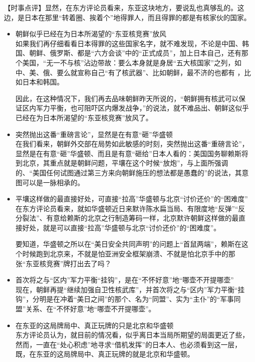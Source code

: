 \documentclass[a4paper,11pt]{article}
\begin{document}
\begin{itemize}
   【时事点评】显然，在东方评论员看来，东亚这块地方，要说乱也真够乱的。这边，是日本在那里“转着圈、挨着个”地得罪人，而且得罪的都是有核家伙的国家。
 
 
\begin{itemize}

\item 朝鲜似乎已经在为日本所渴望的“东亚核竞赛”放风\\
\label{sec-4_3_1}%
如果我们再仔细看看日本得罪的这些国家名字，就不难发现，不论是中国、韩国、朝鲜、俄罗斯、都是“六方会谈”中的“正式成员”，加上日本自己，还有那个美国，“无一不与核”沾边带故：要么本身就是身居“五大核国家”之列，如中、美、俄、要么就宣称自己“有了核武器”、比如朝鲜，最不济的也都有
    ，比如日本和韩国。

    因此，在这种情况下，我们再去品味朝鲜昨天所说的，“朝鲜拥有核武可以保证区内军力平衡，也可阻吓区内爆发战争，”的说法，就不难品出、朝鲜这似乎已经在为日本所渴望的“东亚核竞赛”放风了。
 

\item 突然抛出这番“重磅言论”，显然是在有意“砸”华盛顿\\
\label{sec-4_3_2}%
在我们看来，朝鲜外交部在局势如此敏感的时刻，突然抛出这番“重磅言论”，显然是在有意“砸”华盛顿、而且是有意“砸给”日本人看的：美国国务聊赖斯将到北京，其重点就是朝鲜问题，平壤在这个时候“放炮”，与上面所强调的、“美国任何试图通过第三方来向朝鲜施压的想法都是愚蠢的”的说法，其意图可以是一脉相承的。
 
 

\item 平壤这样做的最直接好处，可直接“拉高”华盛顿与北京“讨价还价”的“困难度”\\
\label{sec-4_3_3}%
在东方评论员看来，就如华盛顿近日来默许陈水扁当局、有限度地“反弹”“反分裂法”、有意给赖斯的北京之行制造筹码一样，北京默许朝鲜这样做的最直接好处，就是可以直接“拉高”华盛顿与北京“讨价还价”的“困难度”。

    要知道，华盛顿之所以在“美日安全共同声明”的问题上“首鼠两端”，赖斯在这个时候跑到北京来，不就是怕亚洲安全框架崩溃、不就是怕北京手中的那张“东亚核竞赛”牌打出去了吗？
 

\item 首次将之与“区内”军力平衡“挂钩”，是在“不怀好意”地“哪壶不开提哪壶”\\
\label{sec-4_3_4}%
现在，朝鲜再提“继续加强自卫性核武库”，并首次将之与“区内”军力平衡“挂钩”，分明是在冲着“美日之间”的那个、名为“同盟”、实为“主仆”的“军事同盟”关系、在“不怀好意”地“哪壶不开提哪壶”。
 

\item 在东亚的这局牌局中、真正玩牌的只是北京和华盛顿\\
\label{sec-4_3_5}%
东方评论员认为，就目前的情况看，似乎离日本当局所期望的局面更近了些，然而，一直在“处心积虑”地寻求“借机发挥”的日本人、也必须看到这一层，既，在东亚的这局牌局中、真正玩牌的就是北京和华盛顿。


\end{itemize}
\end{itemize}
\end{document}
